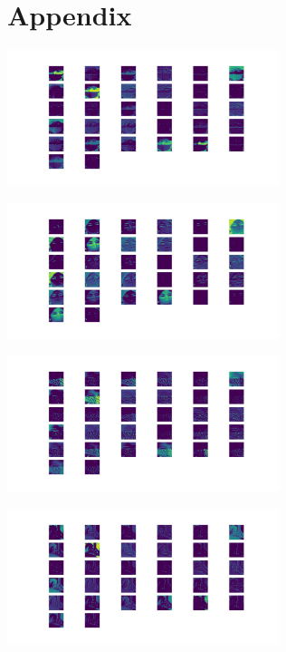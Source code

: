 \section*{Appendix}

\begin{center}
  \label{fig:output-correct}
  \centering
  \includegraphics[width=300px]{figures/correct_first_layer_0.jpg}
\end{center}

\begin{center}
  \label{fig:output-incorrect-1}
  \centering
  \includegraphics[width=300px]{figures/incorrect_first_layer_0.jpg}
\end{center}

\begin{center}
  \label{fig:output-incorrect-2}
  \centering
  \includegraphics[width=300px]{figures/incorrect_first_layer_2.jpg}
\end{center}

\newpage

\begin{center}
  \label{fig:output-incorrect-3}
  \centering
  \includegraphics[width=300px]{figures/incorrect_first_layer_16.jpg}
\end{center}

